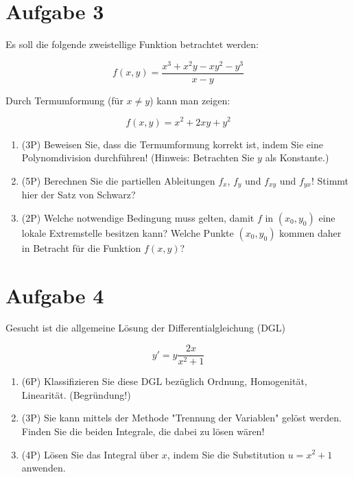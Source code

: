 \documentclass[12pt]{article}
\begin{document}
\newpage
\section* {Aufgabe 3}

Es soll die folgende zweistellige Funktion betrachtet werden:

$$f(x,y)=\frac{x^3+x^2y-xy^2-y^3}{x-y}$$

Durch Termumformung (für $x \neq y$) kann man zeigen:

$$f(x,y) = x^2+2xy+y^2$$

\begin{enumerate}[label=(\alph*)]
\item (3P) Beweisen Sie, dass die Termumformung korrekt ist, indem Sie eine Polynomdivision durchführen! (Hinweis: Betrachten Sie $y$ als Konstante.)


\bigskip
\bigskip
\bigskip
\bigskip
\bigskip
\bigskip
\bigskip
\bigskip
\bigskip
\bigskip
\bigskip
\bigskip
\bigskip
\bigskip
\bigskip

\item (5P) Berechnen Sie die partiellen Ableitungen $f_x$, $f_y$ und $f_{xy}$ und $f_{yx}$! Stimmt hier der Satz von Schwarz?

\item (2P) Welche notwendige Bedingung muss gelten, damit $f$ in $(x_0,y_0)$ eine lokale Extremstelle besitzen kann? Welche Punkte $(x_0,y_0)$ kommen daher in Betracht für die Funktion $f(x,y)$?

\end{enumerate}

\newpage
\section* {Aufgabe 4}

Gesucht ist die allgemeine Lösung der Differentialgleichung (DGL)

$$y'=y\frac{2x}{x^2+1}$$

\begin{enumerate}[label=(\alph*)]
\item (6P) Klassifizieren Sie diese DGL bezüglich Ordnung, Homogenität, Linearität. (Begründung!)
\item (3P) Sie kann mittels der Methode "Trennung der Variablen" gelöst werden. Finden Sie die beiden Integrale, die dabei zu lösen wären!
\item (4P) Lösen Sie das Integral über $x$, indem Sie die Substitution $u=x^2+1$ anwenden.
\end{enumerate}
\end{document}
